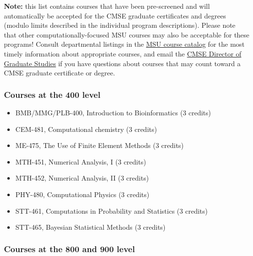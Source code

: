 \textbf{Note:} this list contains courses that have been pre-screened
and will automatically be accepted for the CMSE graduate certificates
and degrees (modulo limits described in the individual program
descriptions).  Please note that other computationally-focused MSU
courses may also be acceptable for these programs!  Consult
departmental listings in the
\href{http://reg.msu.edu/Courses}{MSU course catalog}  for the most
timely information about appropriate courses, and email the
\href{mailto:cmsegrad@msu.edu}{CMSE Director of Graduate Studies} if
you have questions about courses that may count toward a CMSE graduate
certificate or degree.

\vspace{3mm}

\subsubsection{Courses at the 400 level}

\begin{itemize}
\item BMB/MMG/PLB-400, Introduction to Bioinformatics (3 credits)  
\item CEM-481, Computational chemistry (3 credits)  
\item ME-475, The Use of Finite Element Methods (3 credits)  
\item MTH-451, Numerical Analysis, I (3 credits)  
\item MTH-452, Numerical Analysis, II (3 credits)  
\item PHY-480, Computational Physics (3 credits)  
\item STT-461, Computations in Probability and Statistics (3 credits)  
\item STT-465, Bayesian Statistical Methods (3 credits)  
\end{itemize}

\vspace{3mm}

\subsubsection{Courses at the 800 and 900 level}

